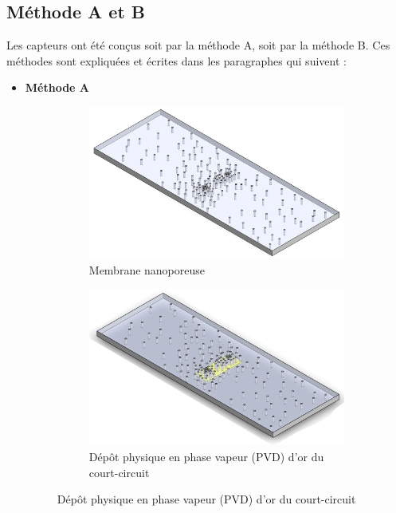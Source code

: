 \newpage
\subsection{Méthode A et B}
Les capteurs ont été conçus soit par la méthode A, soit par la méthode B. Ces méthodes sont expliquées et écrites dans les paragraphes qui suivent :
\begin{itemize}
    \item \textbf{Méthode A}
          \begin{figure}[H]
              \centering
              \begin{subfigure}{0.45\textwidth}
                  \includegraphics[scale = 0.22]{assets/figures/Membrane_nue.png}
                  \caption{Membrane nanoporeuse}
              \end{subfigure}
              \begin{subfigure}{0.45\textwidth}
                  \includegraphics[scale = 0.27]{assets/figures/Court_circuit.png}
                  \caption{Dépôt physique en phase vapeur (PVD) d'or du court-circuit}

\end{subfigure}
\end{figure}
\end{itemize}
